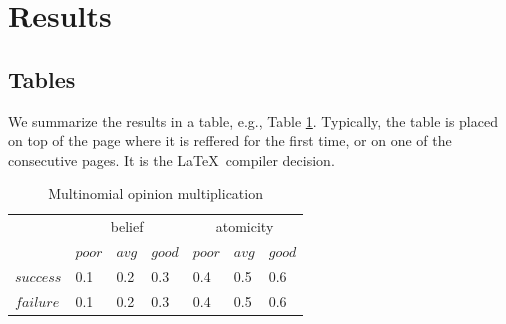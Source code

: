 \documentclass[11pt,a4paper,twoside,notitlepage]{article}
\begin{document}
\section{Results}

\subsection{Tables}

We summarize the results in a table, e.g., Table \ref{Mom}. Typically, the table is placed on top of the page where it is reffered for the first time, 
or on one of the consecutive pages. It is the \LaTeX\  compiler decision. 

\begin{table}%
    \caption{Multinomial opinion multiplication}
    \label{Mom}
        \begin{center}
            \begin{tabular}{|l|l|l|l|l|l|l|}
                \hline 
                & \multicolumn{3}{c|}{belief} & \multicolumn{3}{c|}{atomicity} \\
                \cline{2-7}
                & $poor$ & $avg$ & $good$ & $poor$ & $avg$ & $good$ \\ 
        	\hline
                $success$   &  0.1    &  0.2    &  0.3    & 0.4    & 0.5    &  0.6     \\
                $failure$   &  0.1    &  0.2    &  0.3    & 0.4    & 0.5    &  0.6     \\
                                                    \hline
	    \end{tabular}
        \end{center}
\end{table}
\end{document}

